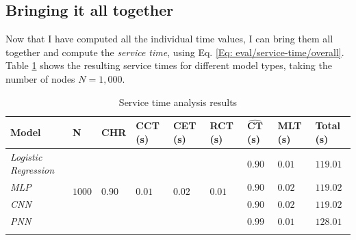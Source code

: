 			\subsection{Bringing it all together} \label{Section: eval/service-time/together}
			Now that I have computed all the individual time values, I can bring them all together and compute the \textit{service time}, using Eq. \ref{Eq: eval/service-time/overall}. Table \ref{Table: eval/service-time/together/overall} shows the resulting service times for different model types, taking the number of nodes $N=1,000$.
			\begin{longtable}{|p{}||p{.08\textwidth}|p{}|p{}|p{}|p{}|p{}|p{}||p{}|}
				\textbf{Model} & \textbf{N} & \textbf{CHR}  &\textbf{CCT} (s) & \textbf{CET} (s) & \textbf{RCT} (s)& $\mathbf{\hat{CT}}$ (s)& \textbf{MLT} (s) & \textbf{Total} (s)\\
				\hline
				\textit{Logistic Regression} & \multirow{5}{*}{$1000$} & \multirow{5}{*}{$0.90$} & \multirow{5}{*}{$0.01$} & \multirow{5}{*}{$0.02$} & \multirow{5}{*}{$0.01$} & $0.90$ & $0.01$ & \cellcolor{green!20} $\mathbf{119.01}$ \\
				\hhline{-~~~~---}
				\textit{MLP} &  &  &   & &  & $0.90$ & $0.02$ &\cellcolor{green!20} $\mathbf{119.02}$  \\
				\hhline{-~~~~---}
				\textit{CNN} &  &  &  & &  & $0.90$ & $0.02$ & \cellcolor{green!20} $\mathbf{119.02}$ \\
				\hhline{-~~~~---}
				\hhline{-~~~~---}
				\textit{PNN} &  &  &  & &  & $0.99$ & $0.01$ & \cellcolor{green!20} $\mathbf{128.01}$ \\
				\hline
				\caption{Service time analysis results}
				\label{Table: eval/service-time/together/overall}
			\end{longtable}
			
